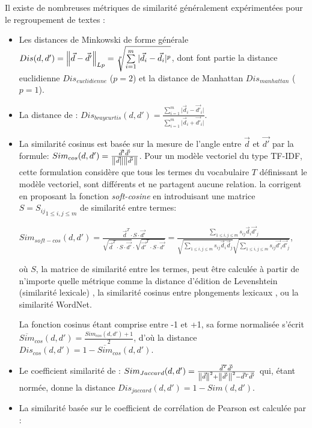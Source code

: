  Il existe de nombreuses métriques de similarité généralement expérimentées pour le regroupement de textes \citep{huang2008similarityTextClustering, vijaymeena2016surveySim, afzali2018SimKmeans}:
\begin{itemize}
	\item Les distances de Minkowski de forme générale $Dis(d,d') = \left\lVert\vec{d} - \vec{d'}\right\rVert_{Lp} = \sqrt[p]{\sum\limits_{i=1}^m \vert \vec{d}_i - \vec{d}_i \vert ^p}$, dont font partie la distance euclidienne $Dis_{euclidienne}$ ($p=2$) et la distance de Manhattan $Dis_{manhattan}$ ($p=1$).
	\item La distance de \citet{bray1957distance-braycurtis}: $Dis_{braycurtis}(d,d') = \frac{\sum\limits_{i=1}^m \vert \vec{d}_i - \vec{d'}_i \vert}{\sum\limits_{i=1}^m \vert \vec{d}_i + \vec{d'}_i \vert}$\citep{huang2008similarityTextClustering}.
	\item La similarité cosinus est basée sur la mesure de l'angle entre $\vec{d}$ et $\vec{d'}$ par la formule: $Sim_{cos}(d,d') = \frac{\vec{d}^t\vec{d'}}{\left\lVert\vec{d}\right\rVert\left\lVert\vec{d'}\right\rVert}$.
	Pour un modèle vectoriel du type TF-IDF, cette formulation considère que tous les termes du vocabulaire $T$ définissant le modèle vectoriel, sont différents et ne partagent aucune relation. \citet{sidorov2014softcosine} la corrigent en proposant la fonction \textit{soft-cosine} en introduisant une matrice $S = {S_{ij}}_{1\leq i,j \leq m}$ de similarité entre  termes: 
	
	$Sim_{soft-cos}(d,d')= \frac{{\vec{d}}^T\cdot S\cdot \vec{d'}}{\sqrt{{\vec{d}}^T\cdot S\cdot \vec{d'}}\cdot \sqrt{\vec{d'}^T\cdot S\cdot \vec{d'}}} = \frac{\sum\limits_{1\leq i,j \leq m}s_{ij}\vec{d}_i\vec{d'}_j}{\sqrt{\sum\limits_{1\leq i,j \leq m}s_{ij}\vec{d}_i\vec{d}_j}\sqrt{\sum\limits_{1\leq i,j \leq m}s_{ij}\vec{d'}_i\vec{d'}_j}}$,
	
	où $S$, la matrice de similarité entre les termes, peut être calculée à partir de n'importe quelle métrique comme la distance d'édition de Levenshtein (similarité lexicale) \citep{sidorov2014softcosine},  la similarité cosinus entre  plongements lexicaux \citep{charlet2017simbow_acl, charlet2017simbow_tal}, ou la similarité WordNet.
	
	La fonction cosinus  étant comprise entre -1 et +1, sa forme normalisée s'écrit  $\overline{Sim}_{cos}(d,d') = \frac{Sim_{cos}(d,d') + 1}{2}$, d'où la distance $Dis_{cos}(d,d') = 1 - \overline{Sim}_{cos}(d,d')$.
	
	\item Le coefficient similarité de \cite{jaccard1901similarite-jaccard}: $Sim_{Jaccard}(d,d') = \frac{\vec{d}^T\vec{d'}}{\left\lVert\vec{d}\right\rVert^2+\left\lVert\vec{d'}\right\rVert^2 - \vec{d}^T\vec{d'}}$ \citep{huang2008similarityTextClustering} qui, étant normée, donne la distance $Dis_{jaccard}(d,d') = 1-Sim(d,d')$.
	\item La similarité basée sur le coefficient de corrélation de Pearson est calculée par \citep{huang2008similarityTextClustering}:
	

\end{itemize}
